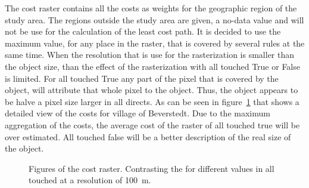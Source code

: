\documentclass[acmtog]{acmart}
\begin{document}
	The cost raster contains all the costs as weights for the geographic region of the study area.
	The regions outside the study area are given, a no-data value and will not be use for the calculation of the least cost path.
	It is decided to use the maximum value, for any place in the raster, that is covered by several rules at the same time.
	When the resolution that is use for the rasterization is smaller than the object size, than the effect of the rasterization with all touched True or False is limited.
	For all touched True any part of the pixel that is covered by the object, will attribute that whole pixel to the object.
	Thus, the object appears to be halve a pixel size larger in all directs.
	As can be seen in figure~\ref{fig:costs_5m} that shows a detailed view of the costs for village of Beverstedt.
	Due to the maximum aggregation of the costs, the average cost of the raster of all touched true will be over estimated.
	All touched false will be a better description of the real size of the object.
	\begin{figure}
		\centering
		
		\qquad
		\caption{Figures of the cost raster. Contrasting the for different values in all touched at a resolution of 100~m.}
		\label{fig:costs_5m}
	\end{figure}
	
\end{document}
